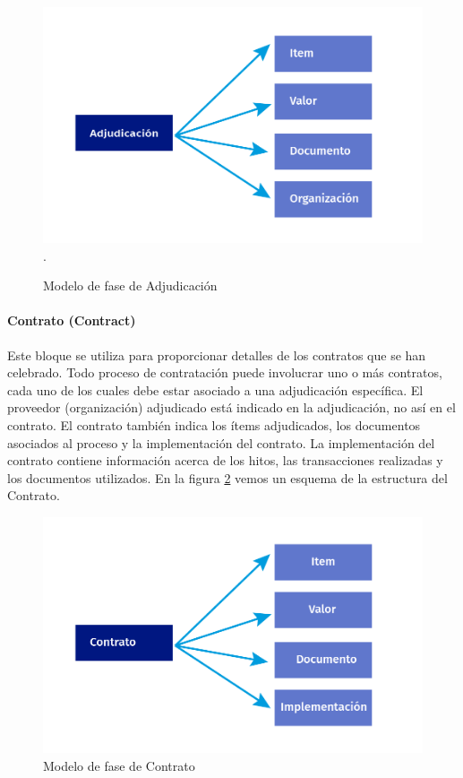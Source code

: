 \begin{figure}[htbp!]
    \centering
    \includegraphics[width=150mm]{figuras/Diagramas_Adjudicacion.png}.
    \caption{Modelo de fase de Adjudicación}
    \label{img:Fase de Adjudiacion}
\end{figure}


\paragraph{Contrato (Contract)}
Este bloque se utiliza para proporcionar detalles de los contratos que se han celebrado. Todo proceso de contratación puede involucrar uno o más contratos, cada uno de los cuales debe estar asociado a una adjudicación específica. El proveedor (organización) adjudicado está indicado en la adjudicación, no así en el contrato. El contrato también indica los ítems adjudicados, los documentos asociados al proceso y la implementación del contrato. La implementación del contrato contiene información acerca de los hitos, las transacciones realizadas y los documentos utilizados. En la figura \ref{img:Fase de Contrato} vemos un esquema de la estructura del Contrato.

\begin{figure}[htbp!]
    \centering
    \includegraphics[width=150mm]{figuras/Diagramas_Contrato.png}
    \caption{Modelo de fase de Contrato}
    \label{img:Fase de Contrato}
\end{figure}

